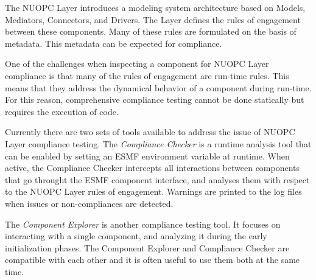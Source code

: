 %

\label{Compliance}

The NUOPC Layer introduces a modeling system architecture based on Models, Mediators, Connectors, and Drivers. The Layer defines the rules of engagement between these components. Many of these rules are formulated on the basis of metadata. This metadata can be expected for compliance.

One of the challenges when inspecting a component for NUOPC Layer compliance is that many of the rules of engagement are run-time rules. This means that they address the dynamical behavior of a component during run-time. For this reason, comprehensive compliance testing cannot be done statically but requires the execution of code.

Currently there are two sets of tools available to address the issue of NUOPC Layer compliance testing. The {\em Compliance Checker} is a runtime analysis tool that can be enabled by setting an ESMF environment variable at runtime. When active, the Compliance Checker intercepts all interactions between components that go throught the ESMF component interface, and analyses them with respect to the NUOPC Layer rules of engagement. Warnings are printed to the log files when issues or non-compliances are detected.

The {\em Component Explorer} is another compliance testing tool. It focuses on interacting with a single component, and analyzing it during the early initialization phases. The Component Explorer and Compliance Checker are compatible with each other and it is often useful to use them both at the same time.

